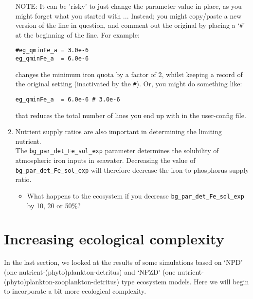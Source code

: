 \documentclass[11pt,fleqn]{book} %
\begin{document}
\begin{enumerate}[noitemsep]
\vspace{1mm}
\item[NOTE:] It can be 'risky' to just change the parameter value in place, as you might forget what you started with ... Instead; you might copy/paste a new version of the line in question, and comment out the original by placing a `\texttt{\#}' at the beginning of the line. For example:
\vspace{-1mm}\small\begin{verbatim}
#eg_qminFe_a = 3.0e-6
eg_qminFe_a  = 6.0e-6
\end{verbatim}\normalsize\vspace{-1mm}
changes the minimum iron quota by a factor of 2, whilst keeping a record of the original setting (inactivated by the \texttt{\#}). Or, you might do something like:
\vspace{-1mm}\small\begin{verbatim}
eg_qminFe_a  = 6.0e-6 # 3.0e-6
\end{verbatim}\normalsize\vspace{-1mm}
that reduces the total number of lines you end up with in the user-config file.

\vspace{1mm}
\item Nutrient supply ratios are also important in determining the limiting nutrient.
\\The \texttt{bg\_par\_det\_Fe\_sol\_exp} parameter determines the solubility of atmospheric iron inputs in seawater. Decreasing the value of \texttt{bg\_par\_det\_Fe\_sol\_exp} will therefore decrease the iron-to-phosphorus supply ratio.
\begin{itemize}
\item What happens to the ecosystem if you decrease \texttt{bg\_par\_det\_Fe\_sol\_exp} by 10, 20 or 50\%?
\end{itemize}

\end{enumerate}
\vspace{2mm}


\newpage


\section{Increasing ecological complexity}

In the last section, we looked at the results of some simulations based on `NPD' (one nutrient-(phyto)plankton-detritus) and `NPZD' (one nutrient-(phyto)plankton-zooplankton-detritus) type ecosystem models. Here we will begin to incorporate a bit more ecological complexity.
\end{document}
